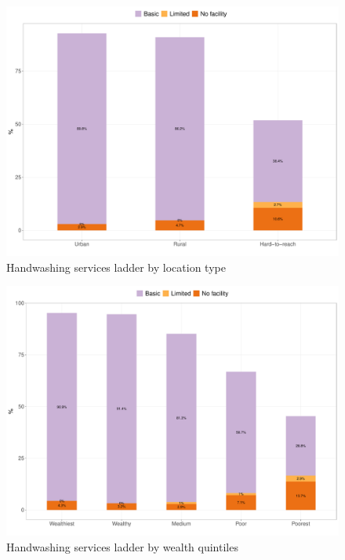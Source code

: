 \documentclass[12pt,a4paper]{article}
\begin{document}
\begin{figure}[H]

{\centering \includegraphics{kayahReport_files/figure-latex/handwashing1plot-1} 

}

\caption{Handwashing services ladder by location type}\label{fig:handwashing1plot}
\end{figure}

\begin{figure}[H]

{\centering \includegraphics{kayahReport_files/figure-latex/handwashing2plot-1} 

}

\caption{Handwashing services ladder by wealth quintiles}\label{fig:handwashing2plot}
\end{figure}
\end{document}
